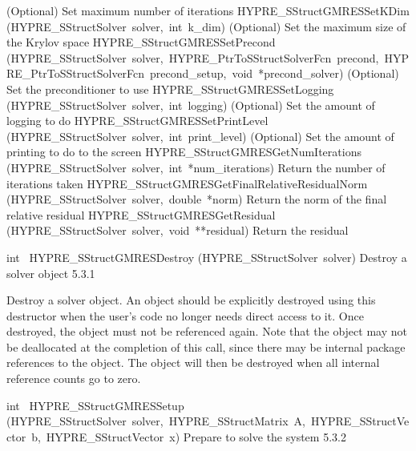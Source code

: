 \documentclass{article}
\begin{document}
\begin{cxxentry}
\begin{cxxentry}
\begin{cxxnames}
{(Optional) Set maximum number of iterations}
        {}
\label{cxx.5.3.7}
        {HYPRE\_SStructGMRESSetKDim}
        {(HYPRE\_SStructSolver\ solver,\ int\ k\_dim)}
        {
(Optional) Set the maximum size of the Krylov space}
        {}
\label{cxx.5.3.8}
        {HYPRE\_SStructGMRESSetPrecond}
        {(HYPRE\_SStructSolver\ solver,\ HYPRE\_PtrToSStructSolverFcn\ precond,\ HYPRE\_PtrToSStructSolverFcn\ precond\_setup,\ void\ *precond\_solver)}
        {
(Optional) Set the preconditioner to use}
        {}
\label{cxx.5.3.9}
        {HYPRE\_SStructGMRESSetLogging}
        {(HYPRE\_SStructSolver\ solver,\ int\ logging)}
        {
(Optional) Set the amount of logging to do}
        {}
\label{cxx.5.3.10}
        {HYPRE\_SStructGMRESSetPrintLevel}
        {(HYPRE\_SStructSolver\ solver,\ int\ print\_level)}
        {
(Optional) Set the amount of printing to do to the screen}
        {}
\label{cxx.5.3.11}
        {HYPRE\_SStructGMRESGetNumIterations}
        {(HYPRE\_SStructSolver\ solver,\ int\ *num\_iterations)}
        {
Return the number of iterations taken}
        {}
\label{cxx.5.3.12}
        {HYPRE\_SStructGMRESGetFinalRelativeResidualNorm}
        {(HYPRE\_SStructSolver\ solver,\ double\ *norm)}
        {
Return the norm of the final relative residual}
        {}
\label{cxx.5.3.13}
        {HYPRE\_SStructGMRESGetResidual}
        {(HYPRE\_SStructSolver\ solver,\ void\ **residual)}
        {
Return the residual}
        {}
\label{cxx.5.3.14}
\end{cxxnames}
\begin{cxxfunction}
{int\ }
        {HYPRE\_SStructGMRESDestroy}
        {(HYPRE\_SStructSolver\ solver)}
        {
Destroy a solver object}
        {5.3.1}
\begin{cxxdoc}

Destroy a solver object.  An object should be explicitly destroyed
using this destructor when the user's code no longer needs direct
access to it.  Once destroyed, the object must not be referenced
again.  Note that the object may not be deallocated at the
completion of this call, since there may be internal package
references to the object.  The object will then be destroyed when
all internal reference counts go to zero.
\end{cxxdoc}
\end{cxxfunction}
\begin{cxxfunction}
{int\ }
        {HYPRE\_SStructGMRESSetup}
        {(HYPRE\_SStructSolver\ solver,\ HYPRE\_SStructMatrix\ A,\ HYPRE\_SStructVector\ b,\ HYPRE\_SStructVector\ x)}
        {
Prepare to solve the system}
        {5.3.2}
\begin{cxxdoc}


\end{cxxdoc}
\end{cxxfunction}
\end{cxxentry}
\end{cxxentry}
\end{document}
